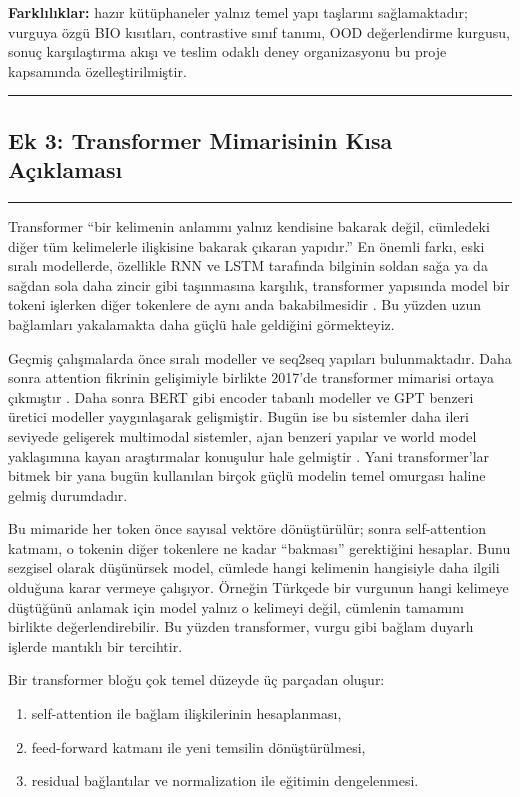 \documentclass[conference]{IEEEtran}
\begin{document}
\textbf{Farklılıklar:} hazır kütüphaneler yalnız temel yapı taşlarını sağlamaktadır; vurguya özgü BIO kısıtları, contrastive sınıf tanımı, OOD değerlendirme kurgusu, sonuç karşılaştırma akışı ve teslim odaklı deney organizasyonu bu proje kapsamında özelleştirilmiştir.

\noindent\rule{\textwidth}{1pt}
\subsection*{\Large Ek 3: Transformer Mimarisinin Kısa Açıklaması}
\noindent\rule{\textwidth}{0.5pt}

Transformer ``bir kelimenin anlamını yalnız kendisine bakarak değil, cümledeki diğer tüm kelimelerle ilişkisine bakarak çıkaran yapıdır.'' En önemli farkı, eski sıralı modellerde, özellikle RNN ve LSTM tarafında bilginin soldan sağa ya da sağdan sola daha zincir gibi taşınmasına karşılık, transformer yapısında model bir tokeni işlerken diğer tokenlere de aynı anda bakabilmesidir \cite{vaswani2017}. Bu yüzden uzun bağlamları yakalamakta daha güçlü hale geldiğini görmekteyiz.

Geçmiş çalışmalarda önce sıralı modeller ve seq2seq yapıları bulunmaktadır. Daha sonra attention fikrinin gelişimiyle birlikte 2017'de transformer mimarisi ortaya çıkmıştır \cite{vaswani2017}. Daha sonra BERT gibi encoder tabanlı modeller \cite{bert2019} ve GPT benzeri üretici modeller yaygınlaşarak gelişmiştir. Bugün ise bu sistemler daha ileri seviyede gelişerek multimodal sistemler, ajan benzeri yapılar ve world model yaklaşımına kayan araştırmalar konuşulur hale gelmiştir \cite{ha2018}. Yani transformer'lar bitmek bir yana bugün kullanılan birçok güçlü modelin temel omurgası haline gelmiş durumdadır.

Bu mimaride her token önce sayısal vektöre dönüştürülür; sonra self-attention katmanı, o tokenin diğer tokenlere ne kadar ``bakması'' gerektiğini hesaplar. Bunu sezgisel olarak düşünürsek model, cümlede hangi kelimenin hangisiyle daha ilgili olduğuna karar vermeye çalışıyor. Örneğin Türkçede bir vurgunun hangi kelimeye düştüğünü anlamak için model yalnız o kelimeyi değil, cümlenin tamamını birlikte değerlendirebilir. Bu yüzden transformer, vurgu gibi bağlam duyarlı işlerde mantıklı bir tercihtir.

Bir transformer bloğu çok temel düzeyde üç parçadan oluşur:
\begin{enumerate}
    \item self-attention ile bağlam ilişkilerinin hesaplanması,
    \item feed-forward katmanı ile yeni temsilin dönüştürülmesi,
    \item residual bağlantılar ve normalization ile eğitimin dengelenmesi.
\end{enumerate}
\end{document}
